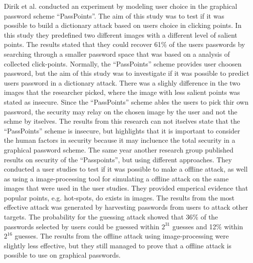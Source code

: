   Dirik et al. \cite{Dirik} conducted an experiment by modeling user choice in the graphical password scheme ``PassPoints''. The aim of this study was to test if it was possible to build a dictionary attack based on users choice in clicking points. In this study they predefined two different images with a different level of salient points. The results stated that they could recover 61\% of the users passwords by searching through a smaller password space that was based on a analysis of collected click-points. Normally, the ``PassPoints'' scheme provides user choosen password, but the aim of this study was to investigate if it was possible to predict users password in a dictionary attack. There was a slighly difference in the two images that the researcher picked, where the image with less salient points was stated as insecure. Since the ``PassPoints'' scheme ables the users to pick thir own password, the security may relay on the chosen image by the user and not the schme by itselves. The results from this research can not itselves state that the ``PassPoints'' scheme is insecure, but highlights that it is important to consider the human factors in security because it may incluence the total security in a graphical password scheme. 
  The same year another research group published \cite{Thorpe} results on security of the ``Passpoints'', but using different approaches. They conducted a user studies to test if it was possible to make a offline attack, as well as using a image-processing tool for simulating a offline attack on the same images that were used in the user studies. They provided emperical evidence that popular points, e.g. hot-spots, do exists in images. The results from the most effective attack was generated by harvesting passwords from users to attack other targets. The probability for the guessing attack showed that 36\% of the passwords selected by users could be guessed within $2^{31}$ guesses and 12\% within $2^{16}$ guesses. The results from the offline attack using image-processing were slightly less effective, but they still managed to prove that a offline attack is possible to use on graphical passwords.   


